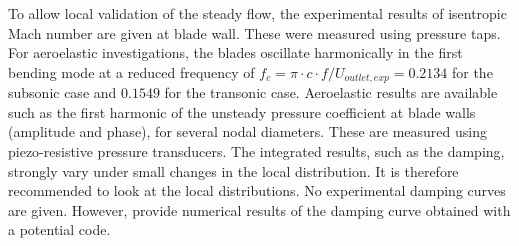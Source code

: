 To allow local validation of the steady
flow, the experimental results of 
isentropic Mach number are given at blade wall. These
were measured using pressure taps.
For aeroelastic investigations, the blades oscillate harmonically in the first bending mode
at a reduced frequency of $f_{c} =\pi \cdot c \cdot
f/U_{outlet, exp} = 0.2134$ for the subsonic case and $0.1549$ for the
transonic case. Aeroelastic
results are available such as the first harmonic of the unsteady pressure
coefficient at blade walls (amplitude and phase), for several nodal
diameters. These are measured using piezo-resistive pressure transducers.
The integrated
results, such as the damping, strongly vary under small changes in the
local distribution. It is therefore recommended to look at the local
distributions. No experimental damping curves are given. However, \citet{Fransson1999}
provide numerical results of the damping curve obtained with a potential code.
